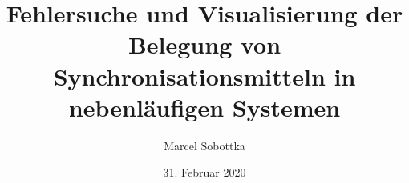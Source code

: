 \title{Fehlersuche und Visualisierung der Belegung von Synchronisationsmitteln
in nebenläufigen Systemen}
\author{Marcel Sobottka}
\date{31. Februar 2020}
\publishers{Betreuer: Marcel Schaible}

\maketitle

\newpage\null\thispagestyle{empty}\newpage